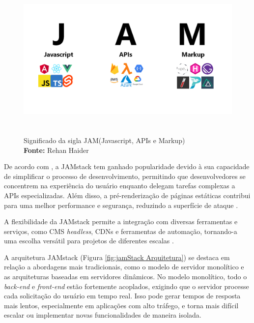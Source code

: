 {\begin{figure}[H]
    \centering
    \includegraphics[height=8cm, keepaspectratio]{img/arquitetura/sigla JAM stack.png}
    \caption{ Significado da sigla JAM(Javascript, APIs e Markup)
 \\
        \textbf{Fonte:} Rehan Haider}
    \label{fig:jamStack sigla}
\end{figure}
De acordo com \cite{smashingmagazine}, a JAMstack tem ganhado popularidade devido à sua capacidade de simplificar o processo de desenvolvimento, permitindo que desenvolvedores se concentrem na experiência do usuário enquanto delegam tarefas complexas a APIs especializadas. Além disso, a pré-renderização de páginas estáticas contribui para uma melhor performance e segurança, reduzindo a superfície de ataque \citep{jamstackbook}.

A flexibilidade da JAMstack permite a integração com diversas ferramentas e serviços, como CMS \textit{headless}, CDNs e ferramentas de automação, tornando-a uma escolha versátil para projetos de diferentes escalas \citep{netlifyjamstack}.

A arquitetura JAMstack (Figura \ref{fig:jamStack Arquitetura}) se destaca em relação a abordagens mais tradicionais, como o modelo de servidor monolítico e as arquiteturas baseadas em servidores dinâmicos. No modelo monolítico, todo o \textit{back-end} e \textit{front-end} estão fortemente acoplados, exigindo que o servidor processe cada solicitação do usuário em tempo real. Isso pode gerar tempos de resposta mais lentos, especialmente em aplicações com alto tráfego, e torna mais difícil escalar ou implementar novas funcionalidades de maneira isolada.

}

